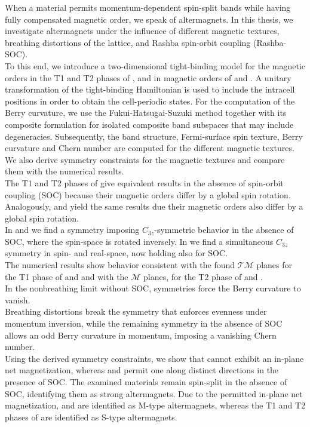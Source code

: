 
When a material permits momentum-dependent spin-split bands while having fully compensated magnetic order, we speak of altermagnets.
In this thesis, we investigate altermagnets under the influence of different magnetic textures, breathing distortions of the lattice, and Rashba spin-orbit coupling (Rashba-SOC).  \\

To this end, we introduce a two-dimensional tight-binding model for the magnetic orders in the T1 and T2 phases of , and in magnetic orders of  and . A unitary transformation of the tight-binding Hamiltonian is used to include the intracell positions in order to obtain the cell-periodic states. For the computation of the Berry curvature, we use the Fukui-Hatsugai-Suzuki method together with its composite formulation for isolated composite band subspaces that may include degeneracies.
Subsequently, the band structure, Fermi-surface spin texture, Berry curvature and Chern number are computed for the different magnetic textures.\\
We also derive symmetry constraints for the magnetic textures and compare them with the numerical results. \\

The T1 and T2 phases of  give equivalent results in the absence of spin-orbit coupling (SOC) because their magnetic orders differ by a global spin rotation. Analogously,  and  yield the same results due their magnetic orders also differ by a global spin rotation.\\
In  and  we find a symmetry imposing $C_{3z}$-symmetric behavior in the absence of SOC, where the spin-space is rotated inversely. In  we find a simultaneous $C_{3z}$ symmetry in spin- and real-space, now holding also for SOC.\\
The numerical results show behavior consistent with the found $\mathcal{TM}$ planes for the T1 phase of  and  and with the $\mathcal{M}$ planes, for the T2 phase of  and .\\
In the nonbreathing limit without SOC, symmetries force the Berry curvature to vanish.\\
Breathing distortions break the symmetry that enforces evenness under momentum inversion, while the remaining symmetry in the absence of SOC allows an odd Berry curvature in momentum, imposing a vanishing Chern number.\\
Using the derived symmetry constraints, we show that  cannot exhibit an in-plane net magnetization, whereas  and  permit one along distinct directions in the presence of SOC. The examined materials remain spin-split in the absence of SOC, identifying them as strong altermagnets. Due to the permitted in-plane net magnetization,  and  are identified as M-type altermagnets, whereas the T1 and T2 phases of  are identified as S-type altermagnets.\\

